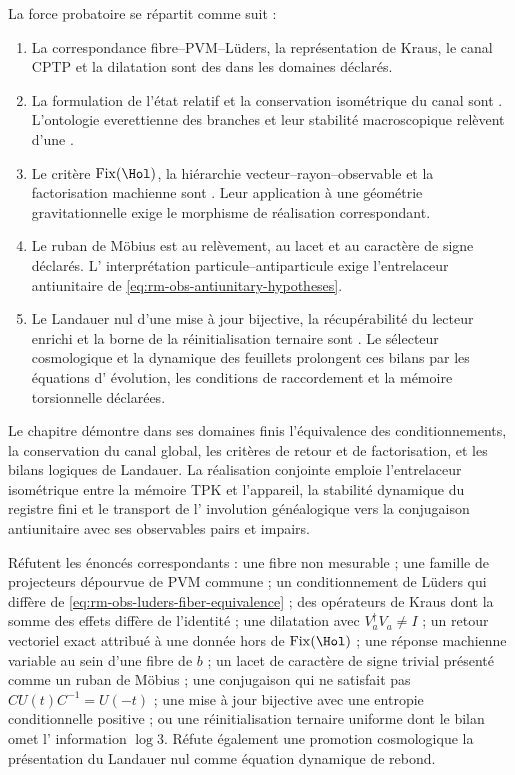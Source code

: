 La force probatoire se répartit comme suit :
\begin{enumerate}[label=\textup{(\roman*)}]
 \item La correspondance fibre--PVM--Lüders, la représentation de
 Kraus, le canal CPTP et la dilatation sont des
  dans les domaines déclarés.
 \item La formulation de l'état relatif et la conservation isométrique
 du canal sont . L'ontologie everettienne des branches et leur
 stabilité macroscopique relèvent d'une
 .
 \item Le critère
 \(\operatorname{Fix}(\Hol)\), la hiérarchie
 vecteur--rayon--observable et la factorisation machienne sont
 . Leur application à une géométrie
 gravitationnelle exige le morphisme de réalisation correspondant.
 \item Le ruban de Möbius est  au
 relèvement, au lacet et au caractère de signe déclarés. L'
 interprétation particule--antiparticule exige l'entrelaceur
 antiunitaire de \cref{eq:rm-obs-antiunitary-hypotheses}.
 \item Le Landauer nul d'une mise à jour bijective, la récupérabilité
 du lecteur enrichi et la borne de la réinitialisation ternaire sont
 . Le sélecteur cosmologique et la
 dynamique des feuillets prolongent ces bilans par les équations d'
 évolution, les conditions de raccordement et la mémoire torsionnelle déclarées.
\end{enumerate}

\begin{proofstatusbox}
Le chapitre démontre dans ses domaines finis l'équivalence des
conditionnements, la conservation du canal global, les critères de
retour et de factorisation, et les bilans logiques de Landauer. La
réalisation conjointe emploie l'entrelaceur isométrique entre la mémoire TPK et
l'appareil, la stabilité dynamique du registre fini et le transport de l'
involution généalogique vers la conjugaison antiunitaire avec ses observables pairs
et impairs.
\end{proofstatusbox}

\begin{falsifierbox}
Réfutent les énoncés correspondants : une fibre non mesurable ; une famille
de projecteurs dépourvue de PVM commune ; un conditionnement de Lüders
qui diffère de \cref{eq:rm-obs-luders-fiber-equivalence} ; des opérateurs de
Kraus dont la somme des effets diffère de l'identité ; une dilatation avec
\(V_a^\dagger V_a\neq I\) ; un retour vectoriel exact attribué à une donnée
hors de \(\operatorname{Fix}(\Hol)\) ; une réponse machienne variable au sein d'une
fibre de \(b\) ; un lacet de caractère de signe trivial présenté comme un ruban
de Möbius ; une conjugaison qui ne satisfait pas
\(CU(t)C^{-1}=U(-t)\) ; une mise à jour bijective avec une entropie
conditionnelle positive ; ou une réinitialisation ternaire uniforme dont le bilan omet l'
information \(\log3\). Réfute également une promotion cosmologique la
présentation du Landauer nul comme équation dynamique de rebond.
\end{falsifierbox}
